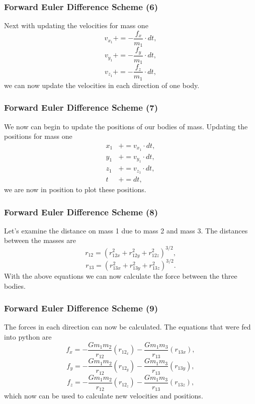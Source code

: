 \documentclass{beamer}
\begin{document}
\begin{frame}
\frametitle{Forward Euler Difference Scheme (6)}
Next with updating the velocities for mass one
\begin{equation*}
v_{x_{1}}+=-\frac{f_x}{m_1}\cdot dt,
\end{equation*}
\begin{equation*}
v_{y_{1}}+=-\frac{f_y}{m_1}\cdot dt,
\end{equation*}
\begin{equation*}
v_{z_{1}}+=-\frac{f_z}{m_1}\cdot dt,
\end{equation*}
we can now update the velocities in each direction of one body. 
\end{frame}
\begin{frame}
\frametitle{Forward Euler Difference Scheme (7)}
We now can begin to update the positions of our bodies of mass. Updating the positions for mass one
\begin{align*}
x_{1}&+=v_{x_{1}}\cdot dt, \\
y_{1}&+=v_{y_{1}}\cdot dt, \\
z_{1}&+=v_{z_{1}}\cdot dt, \\
t&+=dt,
\end{align*}
we are now in position to plot these positions.
\end{frame}
\begin{frame}
\frametitle{Forward Euler Difference Scheme (8)}
Let's examine the distance on mass 1 due to mass 2 and mass 3. The distances between the masses are
\begin{equation*}
r_{12}=(r_{12x}^2+r_{12y}^2+r_{12z}^2)^{3/2},
\end{equation*}
\begin{equation*}
r_{13}=(r_{13x}^2+r_{13y}^2+r_{13z}^2)^{3/2}.
\end{equation*}
With the above equations we can now calculate the force between the three bodies.
\end{frame}
\begin{frame}
\frametitle{Forward Euler Difference Scheme (9)}
The forces in each direction can now be calculated. The equations that were fed into python are
\begin{equation*}
f_{x}=-\frac{Gm_1m_2}{r_{12}}(r_{{12}_x})-\frac{Gm_1m_3}{r_{13}}(r_{13x}),
\end{equation*}
\begin{equation*}
f_{y}=-\frac{Gm_1m_2}{r_{12}}(r_{{12}_y})-\frac{Gm_1m_3}{r_{13}}(r_{13y}),
\end{equation*}
\begin{equation*}
f_{z}=-\frac{Gm_1m_2}{r_{12}}(r_{{12}_z})-\frac{Gm_1m_3}{r_{13}}(r_{13z}),
\end{equation*}
which now can be used to calculate new velocities and positions.
\end{frame}
\end{document}
